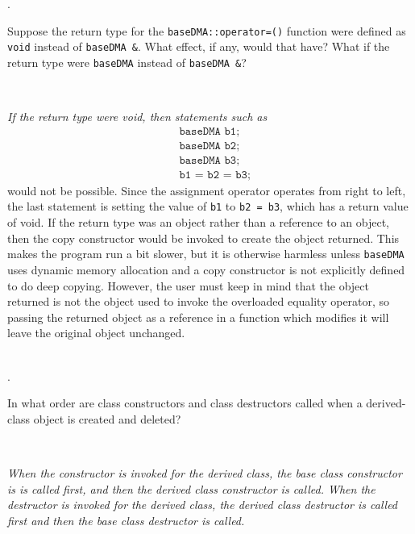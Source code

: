 \documentclass{amsart}
\begin{document}
. 
\begin{minipage}[t]{11.5 cm}
	Suppose the return type for the \texttt{baseDMA::operator=()} function were defined as \texttt{void} instead of \texttt{baseDMA \&}. What effect, if any, would that have? What if the return type were \texttt{baseDMA} instead of \texttt{baseDMA \&}?
\end{minipage} \\[1ex]
\phantom{3. } 
\begin{minipage}[t]{11.5 cm}
	{\slshape 
	If the return type were void, then statements such as
	}
	\begin{align*}
		&\texttt{baseDMA b1;} \\
		&\texttt{baseDMA b2;} \\
		&\texttt{baseDMA b3;} \\
		&\texttt{b1 = b2 = b3;}
	\end{align*}
	would not be possible.
	Since the assignment operator operates from right to left,
	the last statement is setting the value of \verb+b1+ to 
	\verb+b2 = b3+, which has a return value of void. 
	If the return type was an object rather than a reference to 
	an object, then the copy constructor would be invoked to
	create the object returned. 
	This makes the program run a bit slower, but it is otherwise
	harmless unless \verb+baseDMA+ uses dynamic memory allocation
	and a copy constructor is not explicitly defined to do deep copying.
	However, the user must keep in mind that the object returned is
	not the object used to invoke the overloaded equality operator,
	so passing the returned object as a reference in a function which 
	modifies it will leave the original object unchanged. 
\end{minipage} 
\\[2ex]

. 
\begin{minipage}[t]{11.5 cm}
	In what order are class constructors and class destructors called when a derived-class object is created and deleted?
\end{minipage} \\[1ex]
\phantom{2. } 
\begin{minipage}[t]{11.5 cm}
	{\slshape 
	When the constructor is invoked for the derived class, the base 
	class constructor is is called first, and  then the derived 
	class constructor is called. 
	When the destructor is invoked for the derived class, the derived
	class destructor is called first and then the base class destructor
	is called. 
	} 
\end{minipage} 
\\[2ex]
\end{document}
